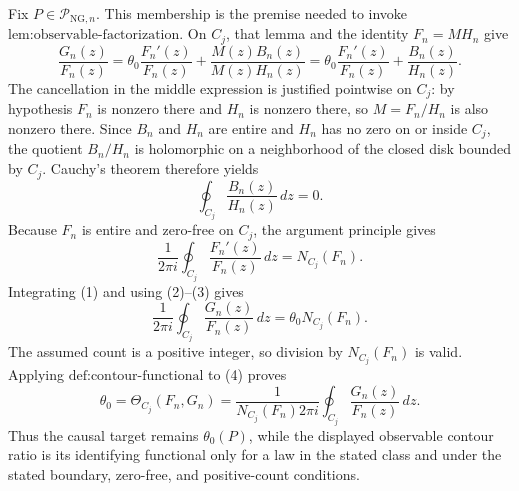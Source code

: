 Fix \(P\in\mathcal P_{\mathrm{NG},n}\).  This membership is the premise needed to invoke \(\text{lem:observable-factorization}\).  On \(C_j\), that lemma and the identity \(F_n=M H_n\) give
\[
 \frac{G_n(z)}{F_n(z)}
 =\theta_0\frac{F_n'(z)}{F_n(z)}+
   \frac{M(z)B_n(z)}{M(z)H_n(z)}
 =\theta_0\frac{F_n'(z)}{F_n(z)}+\frac{B_n(z)}{H_n(z)}.
 \tag{1}
\]
The cancellation in the middle expression is justified pointwise on \(C_j\): by hypothesis \(F_n\) is nonzero there and \(H_n\) is nonzero there, so \(M=F_n/H_n\) is also nonzero there.  Since \(B_n\) and \(H_n\) are entire and \(H_n\) has no zero on or inside \(C_j\), the quotient \(B_n/H_n\) is holomorphic on a neighborhood of the closed disk bounded by \(C_j\).  Cauchy's theorem therefore yields
\[
 \oint_{C_j}\frac{B_n(z)}{H_n(z)}\,dz=0.
 \tag{2}
\]
Because \(F_n\) is entire and zero-free on \(C_j\), the argument principle gives
\[
 \frac{1}{2\pi i}\oint_{C_j}
 \frac{F_n'(z)}{F_n(z)}\,dz=N_{C_j}(F_n).
 \tag{3}
\]
Integrating (1) and using (2)--(3) gives
\[
 \frac{1}{2\pi i}\oint_{C_j}\frac{G_n(z)}{F_n(z)}\,dz
 =\theta_0N_{C_j}(F_n).
 \tag{4}
\]
The assumed count is a positive integer, so division by \(N_{C_j}(F_n)\) is valid.  Applying \(\text{def:contour-functional}\) to (4) proves
\[
 \theta_0
 =\Theta_{C_j}(F_n,G_n)
 =\frac{1}{N_{C_j}(F_n)2\pi i}
   \oint_{C_j}\frac{G_n(z)}{F_n(z)}\,dz.
\]
Thus the causal target remains \(\theta_0(P)\), while the displayed observable contour ratio is its identifying functional only for a law in the stated class and under the stated boundary, zero-free, and positive-count conditions.